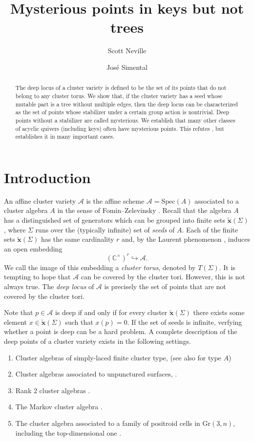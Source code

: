 \documentclass{amsart}
\title{Mysterious points in keys but not trees}
\author{Scott Neville}
\author{Jos\'e Simental}
\newcommand{\seed}{\Sigma}
\newcommand{\excluster}[1]{\widetilde{\mathbf{#1}}}
\newcommand{\var}{\mathcal{A}}
\newcommand{\C}{\mathbb{C}}
\newcommand{\Spec}{\mathrm{Spec}}
\numberwithin{equation}{section}
\theoremstyle{definition}
\begin{document}
\begin{abstract}
The deep locus of a cluster variety is defined to be the set of its points that do not belong to any cluster torus. We show that, if the cluster variety has a seed whose mutable part is a tree without multiple edges, then the deep locus can be characterized as the set of points whose stabilizer under a certain group action is nontrivial. Deep points without a stabilizer are called mysterious. We establish that many other classes of acyclic quivers (including keys) often have mysterious points. This refutes \cite[Conjecture 1.1]{deep}, but establishes it in many important cases.
\end{abstract}

\maketitle

\section{Introduction}

An affine cluster variety $\var$ is the affine scheme $\var = \Spec(A)$ associated to a cluster algebra $A$ in the sense of Fomin--Zelevinsky \cite{FZ1}. Recall that the algebra $A$ has a distinguished set of generators which can be grouped into finite sets $\excluster{x}(\seed)$, where $\seed$ runs over the (typically infinite) set of \emph{seeds} of $A$. Each of the finite sets $\excluster{x}(\seed)$ has the same cardinality $r$ and, by the Laurent phenomenon \cite{LP}, induces an open embedding
\[
(\C^{\times})^{r} \hookrightarrow \var. 
\]
We call the image of this embedding a \emph{cluster torus}, denoted by $T(\seed)$. It is tempting to hope that $\var$ can be covered by the cluster tori. However, this is not always true. The \emph{deep locus} of $\var$ is  precisely the set of points that are not covered by the cluster tori. 

Note that $p \in \var$ is deep if and only if for every cluster $\excluster{x}(\seed)$ there exists some element $x \in \excluster{x}(\seed)$ such that $x(p) = 0$. If the set of seeds is infinite, verfying whether a point is deep can be a hard problem. A complete description of the deep points of a cluster variety exists in the following settings.

\begin{enumerate}
    \item Cluster algebras of simply-laced finite cluster type, \cite{deep} (see also \cite{beyer-muller} for type $A$)
    \item Cluster algebras associated to unpunctured surfaces, \cite{beyer-muller}.
    \item Rank $2$ cluster algebras \cite{beyer-muller}.
    \item The Markov cluster algebra \cite{beyer-muller, deep}.
    \item The cluster algebra associated to a family of positroid cells in $\mathrm{Gr}(3,n)$, including the top-dimensional one \cite{deep}. 
\end{enumerate}
\end{document}

